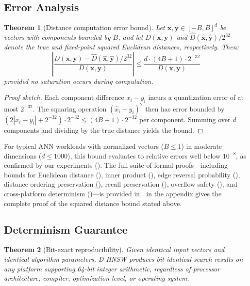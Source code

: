 \documentclass[10pt,journal,compsoc]{IEEEtran}
\newtheorem{theorem}{Theorem}
\newcommand{\dhnsw}{\textsc{D-HNSW}}
\begin{document}
\subsection{Error Analysis}

\begin{theorem}[Distance computation error bound]
\label{thm:error}
Let $\mathbf{x}, \mathbf{y} \in [-B, B]^d$ be vectors with components bounded by $B$, and let $D(\mathbf{x}, \mathbf{y})$ and $\hat{D}(\hat{\mathbf{x}}, \hat{\mathbf{y}})/2^{32}$ denote the true and fixed-point squared Euclidean distances, respectively. Then:
\begin{equation}
  \left|\frac{D(\mathbf{x}, \mathbf{y}) - \hat{D}(\hat{\mathbf{x}}, \hat{\mathbf{y}})/2^{32}}{D(\mathbf{x}, \mathbf{y})}\right| \leq \frac{d \cdot (4B + 1) \cdot 2^{-32}}{D(\mathbf{x}, \mathbf{y})}
\end{equation}
provided no saturation occurs during computation.
\end{theorem}

\begin{proof}[Proof sketch]
Each component difference $x_i - y_i$ incurs a quantization error of at most $2^{-32}$. The squaring operation $(\hat{x}_i - \hat{y}_i)^2$ then has error bounded by $(2|x_i - y_i| + 2^{-32}) \cdot 2^{-32} \leq (4B + 1) \cdot 2^{-32}$ per component. Summing over $d$ components and dividing by the true distance yields the bound.
\end{proof}

For typical ANN workloads with normalized vectors ($B \leq 1$) in moderate dimensions ($d \leq 1000$), this bound evaluates to relative errors well below $10^{-8}$, as confirmed by our experiments (). The full suite of formal proofs---including bounds for Euclidean distance (), inner product (), edge reversal probability (), distance ordering preservation (), recall preservation (), overflow safety (), and cross-platform determinism ()---is provided in .  in the appendix gives the complete proof of the squared distance bound stated above.

\subsection{Determinism Guarantee}

\begin{theorem}[Bit-exact reproducibility]
\label{thm:determinism}
Given identical input vectors and identical algorithm parameters, \dhnsw{} produces bit-identical search results on any platform supporting 64-bit integer arithmetic, regardless of processor architecture, compiler, optimization level, or operating system.
\end{theorem}
\end{document}
